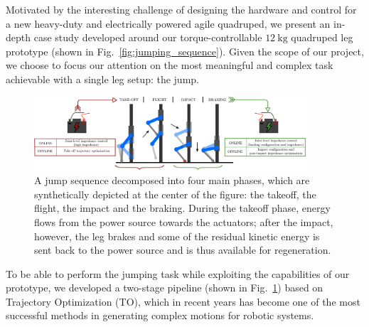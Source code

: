 Motivated by the interesting challenge of designing the hardware and control for a new heavy-duty and electrically powered agile quadruped, we present an in-depth case study developed around our torque-controllable $12~\mathrm{kg}$ quadruped leg prototype (shown in Fig.~\ref{fig:jumping_sequence}). Given the scope of our project, we choose to focus our attention on the most meaningful and complex task achievable with a single leg setup: the jump. 
\begin{figure}[t]
    \centering
    \includegraphics[width=0.9\textwidth]{images/jump_phases_and_pipeline.pdf}
    \caption{A jump sequence decomposed into four main phases, which are synthetically depicted at the center of the figure: the takeoff, the flight, the impact and the braking. During the takeoff phase, energy flows from the power source towards the actuators; after the impact, however, the leg brakes and some of the residual kinetic energy is sent back to the power source and is thus available for regeneration. 
    }
    \label{fig:pipeline}
\end{figure}
To be able to perform the jumping task while exploiting the capabilities of our prototype, we developed a two-stage pipeline (shown in Fig.~\ref{fig:pipeline}) based on Trajectory Optimization (TO), which in recent years has become one of the most successful methods in generating complex motions for robotic systems\cite{agile_bots::nguyen2019optimized,agile_bots::chignoli2021humanoid, agile_bots::roscia2023orientation}.
